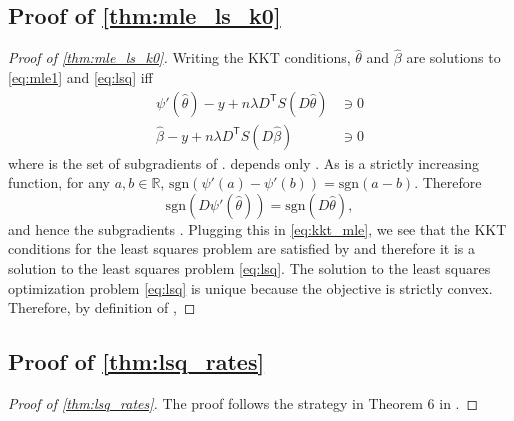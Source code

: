 \documentclass[ejs,noshowframe]{imsart}
\theoremstyle{plain}
\theoremstyle{definition}
\newcommand{\R}{\mathbb{R}}
\renewcommand{\hat}{\widehat}
\renewcommand{\top}{\mathsf{T}}
\begin{document}
\begin{appendix}
\subsection{Proof of \autoref{thm:mle_ls_k0}}
\label{sec:mle_ls_k0_pf}


\begin{proof}[Proof of \autoref{thm:mle_ls_k0}]
	Writing the KKT conditions, $\hat\theta$ and $\hat\beta$ are solutions to 
	\eqref{eq:mle1} and \eqref{eq:lsq} iff
	\begin{align}
		\label{eq:kkt_mle}
		\psi'(\hat \theta) - y + n \lambda D^\top S(D\hat\theta) &\ni 0\\
		\label{eq:kkt_ls}
		\hat\beta - y + n \lambda D^\top S(D\hat\beta) &\ni 0
	\end{align}
	where  is the set of subgradients of . 
	 depends only . 
	As  is a strictly increasing function, for any $a,b\in 
		\R$, 
	$\mathrm{sgn}(\psi'(a)-\psi'(b)) = \mathrm{sgn}(a-b).$
	Therefore
	\begin{equation}
		\mathrm{sgn}(D\psi'(\hat\theta)) = \mathrm{sgn}(D\hat\theta),
	\end{equation}
	and hence the subgradients \smash{$S(D\psi'(\hat\theta)) = S(D\hat\theta)$}.
	Plugging this in \eqref{eq:kkt_mle}, 
	we see that the KKT conditions for the least squares problem are satisfied by
	\smash{$\psi'(\hat\theta)$} and therefore it is a solution to the least
	squares problem \eqref{eq:lsq}.  
	The solution to the least squares optimization problem \eqref{eq:lsq} is 
	unique
	because the objective is strictly convex. Therefore, by definition of
	\smash{$\hat\beta$}, 
	\smash{$
		\hat\beta = \psi'(\hat\theta).
		$}
\end{proof}


\subsection{Proof of \autoref{thm:lsq_rates}}
\label{sec:lsq_rates_proof}

\begin{proof}[Proof of \autoref{thm:lsq_rates}]
	
	The proof follows the strategy in Theorem 6 in \citet{WangSharpnack2016}. 
	

\end{proof}
\end{appendix}
\end{document}
